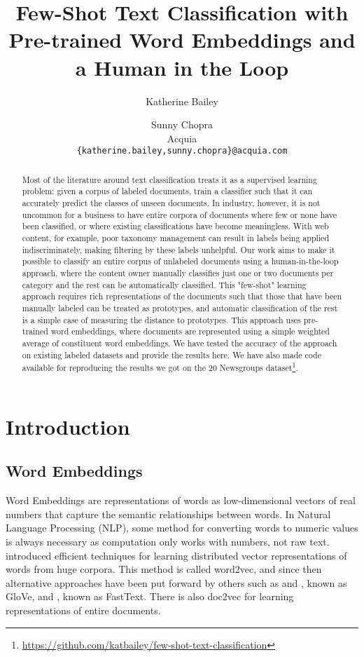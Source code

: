 \documentclass[11pt,letterpaper]{article}
\title{Few-Shot Text Classification with Pre-trained Word Embeddings and a Human in the Loop}
\author{Katherine Bailey\and Sunny Chopra \\
  Acquia \\
  \texttt{\{katherine.bailey,sunny.chopra\}@acquia.com}
}
\date{}
\begin{document}
\maketitle

\begin{abstract}
Most of the literature around text classification treats it as a supervised learning problem: given a corpus of labeled documents, train a classifier such that it can accurately predict the classes of unseen documents. In industry, however, it is not uncommon for a business to have entire corpora of documents where few or none have been classified, or where existing classifications have become meaningless. With web content, for example, poor taxonomy management can result in labels being applied indiscriminately, making filtering by these labels unhelpful. Our work aims to make it possible to classify an entire corpus of unlabeled documents using a human-in-the-loop approach, where the content owner manually classifies just one or two documents per category and the rest can be automatically classified. This "few-shot" learning approach requires rich representations of the documents such that those that have been manually labeled can be treated as prototypes, and automatic classification of the rest is a simple case of measuring the distance to prototypes. This approach uses pre-trained word embeddings, where documents are represented using a simple weighted average of constituent word embeddings. We have tested the accuracy of the approach on existing labeled datasets and provide the results here. We have also made code available for reproducing the results we got on the 20 Newsgroups dataset\footnote{\url{https://github.com/katbailey/few-shot-text-classification}}.
\end{abstract}

\section{Introduction}

\subsection*{Word Embeddings}

Word Embeddings are representations of words as low-dimensional vectors of real numbers that capture the semantic relationships between words. In Natural Language Processing (NLP), some method for converting words to numeric values is always necessary as computation only works with numbers, not raw text.  introduced efficient techniques for learning distributed vector representations of words from huge corpora. This method is called word2vec, and since then alternative approaches have been put forward by others such as and , known as GloVe, and , known as FastText. There is also doc2vec for learning representations of entire documents.
\end{document}
